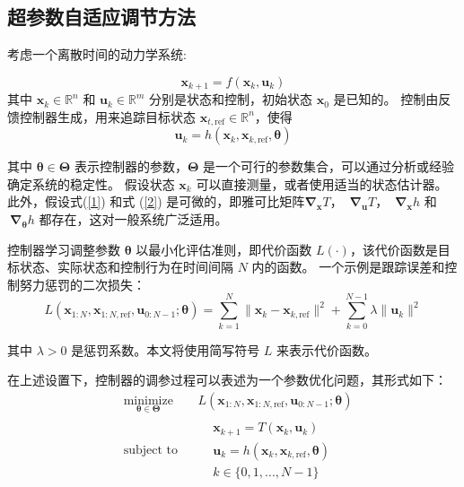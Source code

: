 \documentclass[lang=chs, degree=master, blindreview=true, winfonts=true]{yanputhesis}
\begin{document}
\subsection{超参数自适应调节方法}
考虑一个离散时间的动力学系统:

\begin{equation}
    \bm x_{k+1} = f(\bm x_k, \bm u_k)
	\label{1}
\end{equation}
其中 \( \bm x_k \in \mathbb{R}^n \) 和 \( \bm u_k \in \mathbb{R}^m \) 分别是状态和控制，初始状态 \( \bm x_0 \) 是已知的。  
控制由反馈控制器生成，用来追踪目标状态 \( \bm x_{t,\text{ref}} \in \mathbb{R}^n \)，使得
\begin{equation}
    \bm u_k = h(\bm x_k, \bm x_{k,\text{ref}}, \bm \theta)
	\label{2}
\end{equation}

其中 \( \bm \theta \in \bm \Theta \) 表示控制器的参数，\( \bm \Theta \) 是一个可行的参数集合，可以通过分析或经验确定系统的稳定性。  
假设状态 \( {\bm x}_k \) 可以直接测量，或者使用适当的状态估计器。此外，假设式(\ref{1}) 和式 (\ref{2}) 是可微的，即雅可比矩阵$\bm \nabla_{\bm x} T$， $\ \bm \nabla_{\bm u} T$， $\ \bm \nabla_{\bm x} h$ 和 $\ \bm \nabla_{\bm \theta} h$
都存在，这对一般系统广泛适用。

控制器学习调整参数 \( \bm \theta \) 以最小化评估准则，即代价函数 \( L(\cdot) \)，该代价函数是目标状态、实际状态和控制行为在时间间隔 \( N \) 内的函数。  
一个示例是跟踪误差和控制努力惩罚的二次损失：
\begin{equation}
	L(\bm x_{1:N}, \bm x_{{1:N},\text{ref}}, \bm u_{0:N-1}; \bm \theta) = \sum_{k=1}^{N} \| \bm x_k - \bm {x}_{k,\text{ref}} \|^2 + \sum_{k=0}^{N-1} \lambda \| \bm u_k \|^2
	\label{3}
\end{equation}

其中 \( \lambda > 0 \) 是惩罚系数。本文将使用简写符号 \( L \) 来表示代价函数。

在上述设置下，控制器的调参过程可以表述为一个参数优化问题，其形式如下：
\begin{equation}
	\label{5}
	\begin{aligned} 
		&\operatorname*{minimize}_{\bm \theta \in \bm \Theta} & & L(\bm x_{1:N}, \bm x_{{1:N},\text{ref}}, \bm u_{0:N-1}; \bm \theta) \\
		&\text{subject to} & & \begin{aligned}
			&\boldsymbol{x}_{{k+1}} = {{T}}\left(\boldsymbol{x}_{k}, \boldsymbol{u}_{{k}}\right) \\
			&\bm u_k = h(\bm x_k, \bm x_{k,\text{ref}}, \bm \theta)\\& k \in \{0,1,...,N-1 \}
		\end{aligned} \\
	\end{aligned}
\end{equation}
\end{document}
